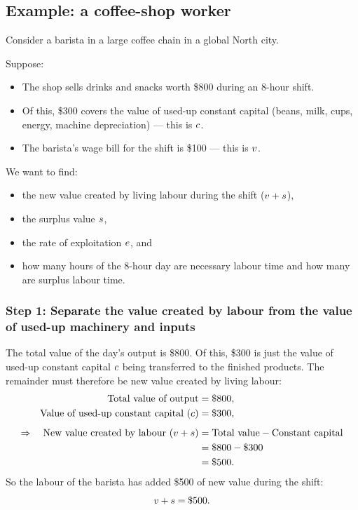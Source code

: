 \subsection{Example: a coffee-shop worker}

Consider a barista in a large coffee chain in a global North city.

\begin{example}
Suppose:

\begin{itemize}[leftmargin=1.5em]
  \item The shop sells drinks and snacks worth \$800 during an 8-hour shift.
  \item Of this, \$300 covers the value of used-up constant capital (beans, milk,
        cups, energy, machine depreciation) --- this is $c$.
  \item The barista's wage bill for the shift is \$100 --- this is $v$.
\end{itemize}

We want to find:

\begin{itemize}[leftmargin=1.5em]
  \item the new value created by living labour during the shift ($v + s$),
  \item the surplus value $s$,
  \item the rate of exploitation $e$, and
  \item how many hours of the 8-hour day are necessary labour time and how many
        are surplus labour time.
\end{itemize}

\subsubsection*{Step 1: Separate the value created by labour from the value of used-up machinery and inputs}

The total value of the day's output is \$800.  Of this, \$300 is just the value of
used-up constant capital $c$ being transferred to the finished products.
The remainder must therefore be new value created by living labour:
\begin{align*}
  \text{Total value of output} &= \$800,\\
  \text{Value of used-up constant capital } (c) &= \$300,\\[0.5em]
  \Rightarrow\quad
  \text{New value created by labour } (v + s)
    &= \text{Total value} - \text{Constant capital}\\
    &= \$800 - \$300\\
    &= \$500.
\end{align*}
So the labour of the barista has added \$500 of new value during the shift:
\[
  v + s = \$500.
\]


\end{example}
